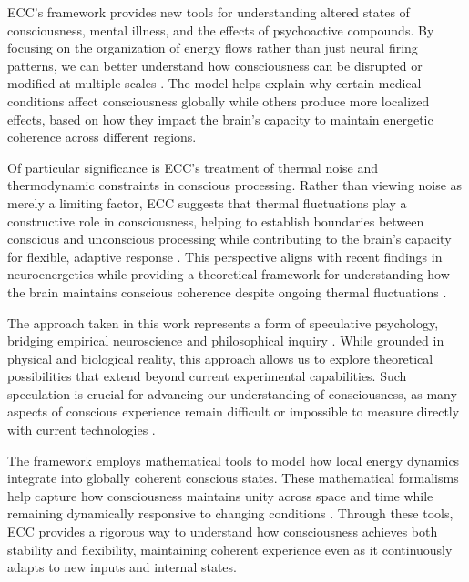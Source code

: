 \begin{refsection}
ECC's framework provides new tools for understanding altered states of consciousness, mental illness, and the effects of psychoactive compounds. By focusing on the organization of energy flows rather than just neural firing patterns, we can better understand how consciousness can be disrupted or modified at multiple scales \cite{varela1991embodied}. The model helps explain why certain medical conditions affect consciousness globally while others produce more localized effects, based on how they impact the brain's capacity to maintain energetic coherence across different regions.

Of particular significance is ECC's treatment of thermal noise and thermodynamic constraints in conscious processing. Rather than viewing noise as merely a limiting factor, ECC suggests that thermal fluctuations play a constructive role in consciousness, helping to establish boundaries between conscious and unconscious processing while contributing to the brain's capacity for flexible, adaptive response \cite{prigogine2018order}. This perspective aligns with recent findings in neuroenergetics while providing a theoretical framework for understanding how the brain maintains conscious coherence despite ongoing thermal fluctuations \cite{Berndt2012}.

The approach taken in this work represents a form of speculative psychology, bridging empirical neuroscience and philosophical inquiry \cite{seth2021being}. While grounded in physical and biological reality, this approach allows us to explore theoretical possibilities that extend beyond current experimental capabilities. Such speculation is crucial for advancing our understanding of consciousness, as many aspects of conscious experience remain difficult or impossible to measure directly with current technologies \cite{block1995confusion}.

The framework employs mathematical tools to model how local energy dynamics integrate into globally coherent conscious states. These mathematical formalisms help capture how consciousness maintains unity across space and time while remaining dynamically responsive to changing conditions \cite{Bredon1997,Arnowitt2008}. Through these tools, ECC provides a rigorous way to understand how consciousness achieves both stability and flexibility, maintaining coherent experience even as it continuously adapts to new inputs and internal states.


\end{refsection}
